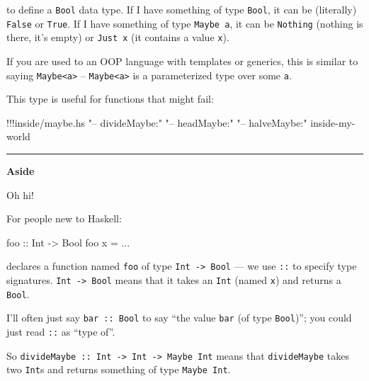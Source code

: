 \documentclass[]{article}
\newenvironment{Shaded}{}{}
\newcommand{\DataTypeTok}[1]{\textcolor[rgb]{0.56,0.13,0.00}{{#1}}}
\newcommand{\StringTok}[1]{\textcolor[rgb]{0.25,0.44,0.63}{{#1}}}
\newcommand{\OtherTok}[1]{\textcolor[rgb]{0.00,0.44,0.13}{{#1}}}
\newcommand{\FunctionTok}[1]{\textcolor[rgb]{0.02,0.16,0.49}{{#1}}}
\newcommand{\NormalTok}[1]{{#1}}
\begin{document}
to define a \texttt{Bool} data type. If I have something of type
\texttt{Bool}, it can be (literally) \texttt{False} or \texttt{True}. If
I have something of type \texttt{Maybe\ a}, it can be \texttt{Nothing}
(nothing is there, it's empty) or \texttt{Just\ x} (it contains a value
\texttt{x}).

If you are used to an OOP language with templates or generics, this is
similar to saying \texttt{Maybe\textless{}a\textgreater{}} --
\texttt{Maybe\textless{}a\textgreater{}} is a parameterized type over
some \texttt{a}.

This type is useful for functions that might fail:

\begin{Shaded}
\begin{Highlighting}[]
\FunctionTok{!!!}\NormalTok{inside}\FunctionTok{/}\NormalTok{maybe}\FunctionTok{.}\NormalTok{hs }\StringTok{"-- divideMaybe:"} \StringTok{"-- headMaybe:"} \StringTok{"-- halveMaybe:"} \NormalTok{inside}\FunctionTok{-}\NormalTok{my}\FunctionTok{-}\NormalTok{world}
\end{Highlighting}
\end{Shaded}

\begin{center}\rule{0.5\linewidth}{\linethickness}\end{center}

\textbf{Aside}

Oh hi!

For people new to Haskell:

\begin{Shaded}
\begin{Highlighting}[]
\OtherTok{foo ::} \DataTypeTok{Int} \OtherTok{->} \DataTypeTok{Bool}
\NormalTok{foo x }\FunctionTok{=} \FunctionTok{...}
\end{Highlighting}
\end{Shaded}

declares a function named \texttt{foo} of type
\texttt{Int\ -\textgreater{}\ Bool} --- we use \texttt{::} to specify
type signatures. \texttt{Int\ -\textgreater{}\ Bool} means that it takes
an \texttt{Int} (named \texttt{x}) and returns a \texttt{Bool}.

I'll often just say \texttt{bar\ ::\ Bool} to say ``the value
\texttt{bar} (of type \texttt{Bool})''; you could just read \texttt{::}
as ``type of''.

So
\texttt{divideMaybe\ ::\ Int\ -\textgreater{}\ Int\ -\textgreater{}\ Maybe\ Int}
means that \texttt{divideMaybe} takes two \texttt{Int}s and returns
something of type \texttt{Maybe\ Int}.
\end{document}
